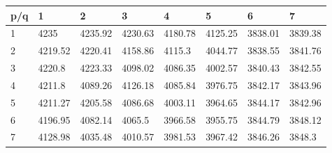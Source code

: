 \begin{tabular}{llllllll}
\toprule
p/q &        1 &        2 &        3 &        4 &        5 &        6 &        7 \\
\midrule
  1 &     4235 &  4235.92 &  4230.63 &  4180.78 &  4125.25 &  3838.01 &  3839.38 \\
  2 &  4219.52 &  4220.41 &  4158.86 &   4115.3 &  4044.77 &  3838.55 &  3841.76 \\
  3 &   4220.8 &  4223.33 &  4098.02 &  4086.35 &  4002.57 &  3840.43 &  3842.55 \\
  4 &   4211.8 &  4089.26 &  4126.18 &  4085.84 &  3976.75 &  3842.17 &  3843.96 \\
  5 &  4211.27 &  4205.58 &  4086.68 &  4003.11 &  3964.65 &  3844.17 &  3842.96 \\
  6 &  4196.95 &  4082.14 &   4065.5 &  3966.58 &  3955.75 &  3844.79 &  3848.12 \\
  7 &  4128.98 &  4035.48 &  4010.57 &  3981.53 &  3967.42 &  3846.26 &   3848.3 \\
\bottomrule
\end{tabular}
